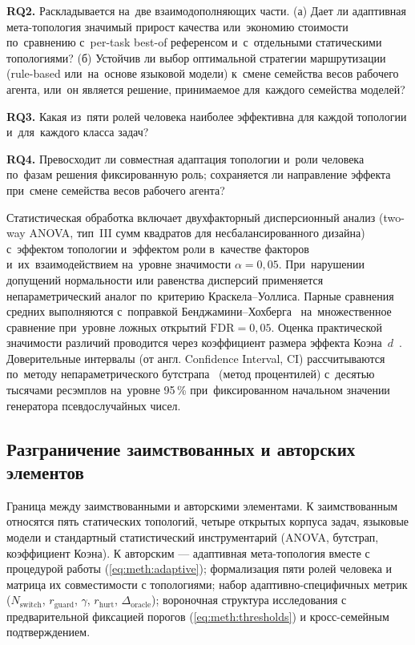 \textbf{RQ2.} Раскладывается на~две взаимодополняющих части. (а)
Дает ли адаптивная мета-топология значимый прирост качества или~экономию
стоимости по~сравнению с~per-task best-of референсом и~с~отдельными
статическими топологиями? (б) Устойчив ли выбор оптимальной
стратегии маршрутизации (rule-based или~на~основе языковой модели) к~смене семейства весов
рабочего агента, или~он является решение, принимаемое для~каждого семейства моделей?

\textbf{RQ3.} Какая из~пяти ролей человека наиболее эффективна для
каждой топологии и~для~каждого класса задач?

\textbf{RQ4.} Превосходит ли совместная адаптация топологии и~роли
человека по~фазам решения фиксированную роль; сохраняется ли
направление эффекта при~смене семейства весов рабочего агента?

Статистическая обработка включает двухфакторный дисперсионный
анализ (two-way ANOVA, тип~III сумм квадратов для несбалансированного
дизайна) с~эффектом топологии и~эффектом роли в~качестве факторов
и~их~взаимодействием на~уровне значимости $\alpha = 0{,}05$.
При~нарушении допущений нормальности или равенства дисперсий
применяется непараметрический аналог по~критерию Краскела--Уоллиса.
Парные сравнения средних выполняются с~поправкой
Бенджамини--Хохберга~\cite{benjamini1995} на~множественное сравнение
при~уровне ложных открытий $\text{FDR} = 0{,}05$. Оценка практической
значимости различий проводится через коэффициент размера эффекта
Коэна~$d$~\cite{cohen1988}. Доверительные интервалы (от англ.
Confidence Interval, CI) рассчитываются по~методу непараметрического
бутстрапа~\cite{efron1979} (метод процентилей) с~десятью тысячами
ресэмплов на~уровне 95\,\% при~фиксированном начальном значении
генератора псевдослучайных чисел.

\subsection{Разграничение заимствованных и авторских элементов}
\label{sec:meth:boundary}

Граница между заимствованными и авторскими элементами. К
заимствованным относятся пять статических топологий, четыре
открытых корпуса задач, языковые модели и стандартный
статистический инструментарий (ANOVA, бутстрап, коэффициент Коэна).
К авторским --- адаптивная мета-топология вместе с процедурой
работы (\ref{eq:meth:adaptive}); формализация пяти ролей человека
и матрица их совместимости с топологиями; набор адаптивно-специфичных
метрик ($N_{\text{switch}}$, $r_{\text{guard}}$, $\gamma$,
$r_{\text{hurt}}$, $\Delta_{\text{oracle}}$); вороночная структура
исследования с предварительной фиксацией порогов
(\ref{eq:meth:thresholds}) и кросс-семейным подтверждением.

